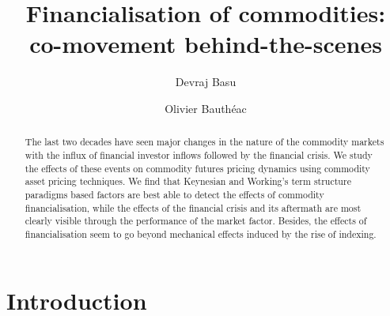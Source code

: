 \documentclass[]{elsarticle} %
\begin{document}
\begin{frontmatter}

  \title{Financialisation of commodities: co-movement behind-the-scenes}
    \author[strath]{Devraj Basu}
    \author[strath]{Olivier Bauthéac}
  
      \address[strath]{University of Strathclyde Business school}
  
  \begin{abstract}
  The last two decades have seen major changes in the nature of the commodity markets with the influx of financial investor inflows followed by the financial crisis. We study the effects of these events on commodity futures pricing dynamics using commodity asset pricing techniques. We find that Keynesian and Working's term structure paradigms based factors are best able to detect the effects of commodity financialisation, while the effects of the financial crisis and its aftermath are most clearly visible through the performance of the market factor. Besides, the effects of financialisation seem to go beyond mechanical effects induced by the rise of indexing.
  \end{abstract}
  
 \end{frontmatter}

\cleardoublepage

\hypertarget{index}{%
\section{Introduction}\label{index}}
\end{document}
